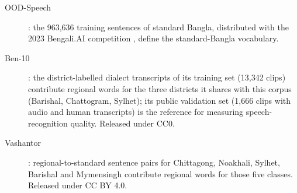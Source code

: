 \begin{description}
  \item[OOD-Speech] \cite{Rakib2023OODSpeech}: the 963,636 training sentences
    of standard Bangla, distributed with the 2023 Bengali.AI competition
    \cite{BengaliAI2023Speech}, define the standard-Bangla vocabulary.
  \item[Ben-10] \cite{Dipto2025ASR}: the district-labelled dialect
    transcripts of its training set (13,342 clips) contribute regional words for
    the three districts it shares with this corpus (Barishal, Chattogram,
    Sylhet); its public validation set (1,666 clips with audio and human
    transcripts) is the reference for measuring speech-recognition quality.
    Released under CC0.
  \item[Vashantor] \cite{Faria2023Vashantor}: regional-to-standard sentence
    pairs for Chittagong, Noakhali, Sylhet, Barishal and Mymensingh contribute
    regional words for those five classes. Released under CC BY 4.0.
\end{description}
